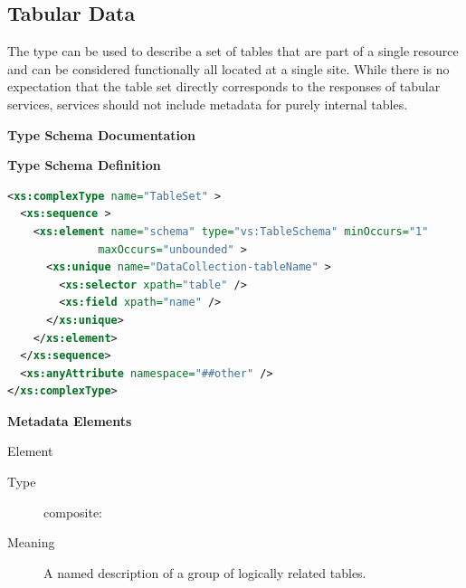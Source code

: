 \documentclass[11pt,a4paper]{ivoa}
\begin{document}

\subsection{Tabular Data}
\label{sect:table}


The  type can be used
to describe a set of tables that are part of a single resource and can
be considered functionally all located at a single site.  While there is
no expectation that the table set directly corresponds to the responses
of tabular services,
services should not include metadata for purely internal
tables.



\begin{generated}
\begingroup
      	\renewcommand*\descriptionlabel[1]{%
      	\hbox to 5.5em{\emph{#1}\hfil}}\vspace{2ex}\noindent\textbf{ Type Schema Documentation}


\vspace{1ex}\noindent\textbf{ Type Schema Definition}

\begin{lstlisting}[language=XML,basicstyle=\footnotesize]
<xs:complexType name="TableSet" >
  <xs:sequence >
    <xs:element name="schema" type="vs:TableSchema" minOccurs="1"
              maxOccurs="unbounded" >
      <xs:unique name="DataCollection-tableName" >
        <xs:selector xpath="table" />
        <xs:field xpath="name" />
      </xs:unique>
    </xs:element>
  </xs:sequence>
  <xs:anyAttribute namespace="##other" />
</xs:complexType>
\end{lstlisting}

\vspace{0.5ex}\noindent\textbf{ Metadata Elements}

\begingroup\small\begin{bigdescription}\item[Element \xmlel{schema}]
\begin{description}
\item[Type] composite: 
\item[Meaning] 
                A named description of a group of logically related tables.
              

\end{description}
\end{bigdescription}
\end{generated}
\end{document}
